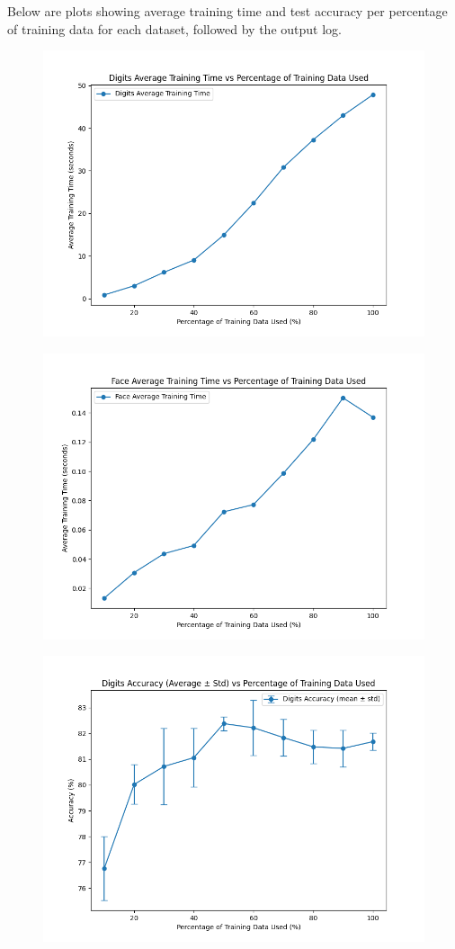 \documentclass{article}
\begin{document}
\noindent Below are plots showing average training time and test accuracy per percentage of training data for each dataset, followed by the output log.
\begin{figure}[H]
    \centering
    \includegraphics[width=.75\textwidth]{report/report_figures/perceptron_digits_time.png}
\end{figure}
\begin{figure}[H]
    \centering
    \includegraphics[width=.75\textwidth]{report/report_figures/perceptron_face_time.png}
\end{figure}
\begin{figure}[H]
    \centering
    \includegraphics[width=.75\textwidth]{report/report_figures/perceptron_digits_acc.png}
\end{figure}
\end{document}

